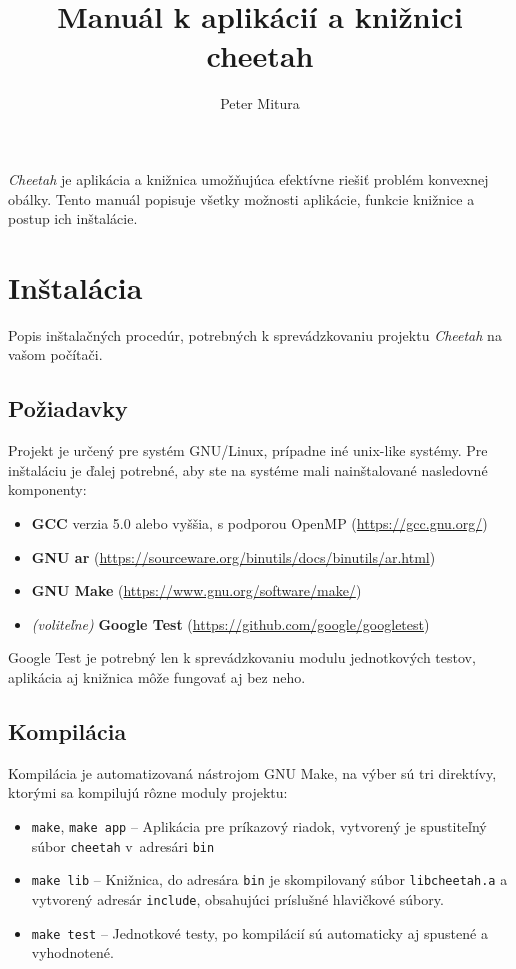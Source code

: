 \documentclass[a4paper, 12pt, slovak]{article}
\begin{document}
\title{Manuál k aplikácií a knižnici cheetah}
\date{}
\author{Peter Mitura}
\maketitle

\emph{Cheetah} je aplikácia a knižnica umožňujúca efektívne riešiť problém konvexnej 
obálky. Tento manuál popisuje všetky možnosti aplikácie, funkcie knižnice a postup 
ich inštalácie.

\tableofcontents
\pagebreak

\section{Inštalácia}
Popis inštalačných procedúr, potrebných k sprevádzkovaniu projektu \emph{Cheetah} na 
vašom počítači.
\subsection{Požiadavky}
Projekt je určený pre systém GNU/Linux, prípadne iné unix-like systémy. Pre 
inštaláciu je ďalej potrebné, aby ste na systéme mali nainštalované nasledovné 
komponenty:

\begin{itemize}
 \item \textbf{GCC} verzia 5.0 alebo vyššia, s podporou OpenMP 
(\url{https://gcc.gnu.org/})
 \item \textbf{GNU ar} (\url{https://sourceware.org/binutils/docs/binutils/ar.html})
 \item \textbf{GNU Make} (\url{https://www.gnu.org/software/make/})
 \item \emph{(voliteľne)} \textbf{Google Test} 
(\url{https://github.com/google/googletest})
\end{itemize}

Google Test je potrebný len k sprevádzkovaniu modulu jednotkových testov, aplikácia 
aj knižnica môže fungovať aj bez neho.

\subsection{Kompilácia}
Kompilácia je automatizovaná nástrojom GNU Make, na výber sú tri direktívy, ktorými 
sa kompilujú rôzne moduly projektu:

\begin{itemize}
 \item \texttt{make}, \texttt{make app} -- Aplikácia pre príkazový riadok, vytvorený 
je spustiteľný súbor \texttt{cheetah} v~adresári \texttt{bin}
 \item \texttt{make lib} -- Knižnica, do adresára \texttt{bin} je skompilovaný súbor 
\texttt{libcheetah.a} a vytvorený adresár \texttt{include}, obsahujúci príslušné 
hlavičkové súbory.
 \item \texttt{make test} -- Jednotkové testy, po kompilácií sú automaticky aj 
spustené a vyhodnotené.
\end{itemize}
\end{document}
